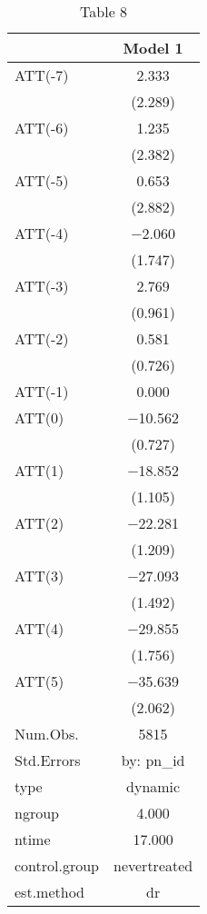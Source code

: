 \begin{table}

\caption{Table 8}
\centering
\begin{tabular}[t]{lc}
\toprule
  & Model 1\\
\midrule
ATT(-7) & \num{2.333}\\
 & (\num{2.289})\\
ATT(-6) & \num{1.235}\\
 & (\num{2.382})\\
ATT(-5) & \num{0.653}\\
 & (\num{2.882})\\
ATT(-4) & \num{-2.060}\\
 & (\num{1.747})\\
ATT(-3) & \num{2.769}\\
 & (\num{0.961})\\
ATT(-2) & \num{0.581}\\
 & (\num{0.726})\\
ATT(-1) & \num{0.000}\\
ATT(0) & \num{-10.562}\\
 & (\num{0.727})\\
ATT(1) & \num{-18.852}\\
 & (\num{1.105})\\
ATT(2) & \num{-22.281}\\
 & (\num{1.209})\\
ATT(3) & \num{-27.093}\\
 & (\num{1.492})\\
ATT(4) & \num{-29.855}\\
 & (\num{1.756})\\
ATT(5) & \num{-35.639}\\
 & (\num{2.062})\\
\midrule
Num.Obs. & \num{5815}\\
Std.Errors & by: pn\_id\\
type & dynamic\\
ngroup & \num{4.000}\\
ntime & \num{17.000}\\
control.group & nevertreated\\
est.method & dr\\
\bottomrule
\end{tabular}
\end{table}
